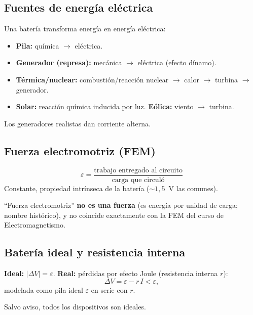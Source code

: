 \documentclass[12pt,a4paper]{article}
\begin{document}
\subsection{Fuentes de energía eléctrica}

Una batería transforma energía en energía eléctrica:
\begin{itemize}[nosep]
  \item \textbf{Pila:} química $\to$ eléctrica.
  \item \textbf{Generador (represa):} mecánica $\to$ eléctrica (efecto
        dínamo).
  \item \textbf{Térmica/nuclear:} combustión/reacción nuclear $\to$
        calor $\to$ turbina $\to$ generador.
  \item \textbf{Solar:} reacción química inducida por luz. \textbf{Eólica:} viento $\to$ turbina.
\end{itemize}
Los generadores realistas dan corriente alterna.

\subsection{Fuerza electromotriz (FEM)}

\begin{keybox}[FEM]
  \[
  \varepsilon = \frac{\text{trabajo entregado al circuito}}{\text{carga que circuló}}
  \]
  Constante, propiedad intrínseca de la batería ($\sim 1{,}5$~V las
  comunes).
\end{keybox}

\begin{warnbox}
  \enquote{Fuerza electromotriz} \textbf{no es una fuerza} (es energía por
  unidad de carga; nombre histórico), y no coincide exactamente con la FEM
  del curso de Electromagnetismo.
\end{warnbox}

\subsection{Batería ideal y resistencia interna}

\textbf{Ideal:} $|\Delta V| = \varepsilon$. \textbf{Real:} pérdidas por
efecto Joule (resistencia interna $r$):
\[
\Delta V = \varepsilon - r\,I < \varepsilon,
\]
modelada como pila ideal $\varepsilon$ en serie con $r$.

\begin{notebox}[Convención]
  Salvo aviso, todos los dispositivos son ideales.
\end{notebox}
\end{document}
